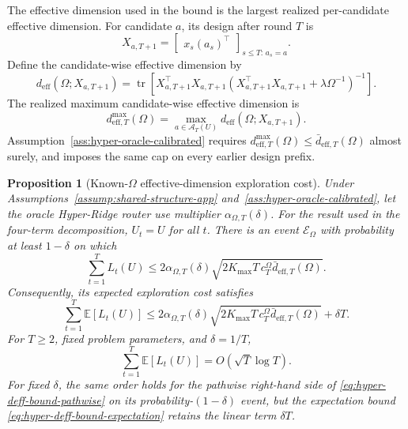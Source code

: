 \documentclass{article} %
\newtheorem{proposition}[theorem]{Proposition}
\begin{document}
The effective dimension used in the bound is the largest realized per-candidate effective dimension. For candidate \(a\), its design after round \(T\) is
\begin{equation}
\label{eq:hyper-oracle-XaT}
X_{a,T+1}
=
\begin{bmatrix}
x_s(a_s)^\top
\end{bmatrix}_{s\le T:\,a_s=a}.
\end{equation}
Define the candidate-wise effective dimension by
\begin{equation}
\label{eq:hyper-oracle-deff-a}
d_{\mathrm{eff}}(\Omega;X_{a,T+1})
=
\operatorname{tr}
\!\left[
X_{a,T+1}^{\top}X_{a,T+1}
\left(
X_{a,T+1}^{\top}X_{a,T+1}+\lambda\Omega^{-1}
\right)^{-1}
\right].
\end{equation}
The realized maximum candidate-wise effective dimension is
\begin{equation}
\label{eq:hyper-oracle-deff-max}
d_{\mathrm{eff},T}^{\max}(\Omega)
=
\max_{a\in\mathcal A_T(U)}
d_{\mathrm{eff}}(\Omega;X_{a,T+1}).
\end{equation}
Assumption~\ref{ass:hyper-oracle-calibrated} requires
$d_{\mathrm{eff},T}^{\max}(\Omega)\le
\bar d_{\mathrm{eff},T}(\Omega)$ almost surely, and imposes the same cap on
every earlier design prefix.

\begin{proposition}[Known-\(\Omega\) effective-dimension exploration cost]
\label{prop:deff-bound-app}
Under Assumptions~\ref{assump:shared-structure-app}
and~\ref{ass:hyper-oracle-calibrated}, let the oracle Hyper-Ridge router use
multiplier $\alpha_{\Omega,T}(\delta)$. For the result used in the four-term
decomposition, \(U_t=U\) for all \(t\). There is an event
$\mathcal E_\Omega$ with probability at least $1-\delta$ on which
\begin{equation}
\label{eq:hyper-deff-bound-pathwise}
\sum_{t=1}^{T}L_t(U)
\le
2\alpha_{\Omega,T}(\delta)
\sqrt{
2K_{\max}T\,c_T^\Omega
\bar d_{\mathrm{eff},T}(\Omega)
}.
\end{equation}
Consequently, its expected exploration cost satisfies
\begin{equation}
\label{eq:hyper-deff-bound-expectation}
\sum_{t=1}^{T}\mathbb{E}[L_t(U)]
\le
2\alpha_{\Omega,T}(\delta)
\sqrt{
2K_{\max}T\,c_T^\Omega
\bar d_{\mathrm{eff},T}(\Omega)
}
+
\delta T .
\end{equation}
For \(T\ge2\), fixed problem parameters, and $\delta=1/T$,
\begin{equation}
\label{eq:hyper-deff-bound-rate}
\sum_{t=1}^{T}\mathbb{E}[L_t(U)]
=
O\!\left(\sqrt{T}\log T\right).
\end{equation}
For fixed $\delta$, the same order holds for the pathwise right-hand side of
\eqref{eq:hyper-deff-bound-pathwise} on its probability-\((1-\delta)\) event,
but the expectation bound \eqref{eq:hyper-deff-bound-expectation} retains the
linear term $\delta T$.
\end{proposition}
\end{document}
